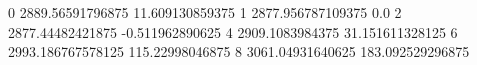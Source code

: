 0 2889.56591796875 11.609130859375
1 2877.956787109375 0.0
2 2877.44482421875 -0.511962890625
4 2909.1083984375 31.151611328125
6 2993.186767578125 115.22998046875
8 3061.04931640625 183.092529296875
